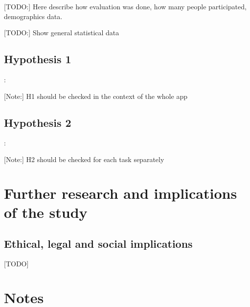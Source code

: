[TODO:] Here describe how evaluation was done, how many people participated, demographics data.

[TODO:] Show general statistical data

	\subsection{Hypothesis 1}: 
	
	[Note:] H1 should be checked in the context of the whole app
	
	\subsection{Hypothesis 2}: 
	
	[Note:] H2 should be checked for each task separately

\section{Further research and implications of the study}

\subsection{Ethical, legal and social implications}

[TODO]

\section{Notes}




